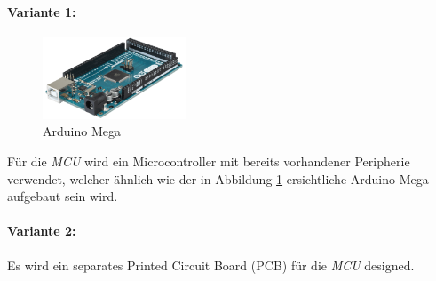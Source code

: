 \paragraph{Variante 1:}
\begin{figure}
  \vspace{-10pt}
  \begin{center}
    \includegraphics[width=0.38\textwidth]{graphics/arduino_mega.png}
  \end{center}
  \vspace{-10pt}
  \caption{Arduino Mega \cite{Elektronik}}
  \vspace{-10pt}
  \label{fig:arduino_mega}
\end{figure}
Für die \textit{MCU} wird ein Microcontroller mit bereits vorhandener Peripherie verwendet, welcher ähnlich wie der in Abbildung \ref{fig:arduino_mega} ersichtliche Arduino Mega aufgebaut sein wird.

\paragraph{Variante 2:}
Es wird ein separates Printed Circuit Board (PCB) für die \textit{MCU} designed.\\

